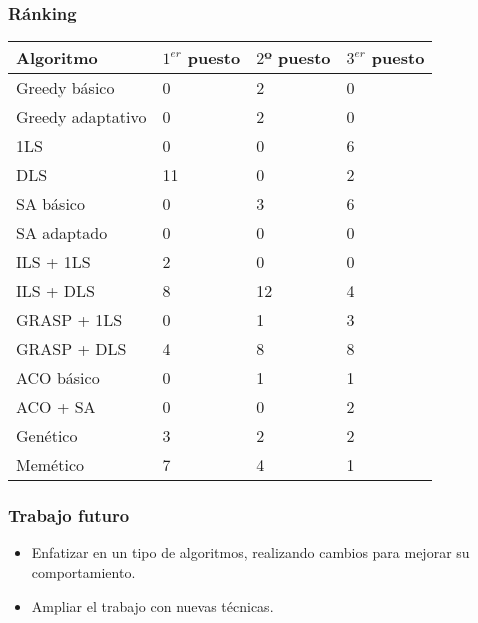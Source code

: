 \documentclass{beamer}
\begin{document}
\begin{frame}
\frametitle{Ránking}

  \tiny
  \begin{table}
  \begin{tabular}{l l l l}
    \textbf{Algoritmo} & \textbf{$1^{er}$ puesto} & \textbf{$2$º puesto} & \textbf{$3^{er}$ puesto} \\ \hline
    Greedy básico          &  0  &  2  &  0  \\ \hline
    Greedy adaptativo      &  0  &  2  &  0  \\ \hline
    1LS                    &  0  &  0  &  6  \\ \hline
    DLS                    &  11  &  0  &  2  \\ \hline
    SA básico              &  0  &  3  &  6  \\ \hline
    SA adaptado            &  0  &  0  &  0  \\ \hline
    ILS + 1LS              &  2  &  0  &  0  \\ \hline
    ILS + DLS              &  8  &  12  &  4  \\ \hline
    GRASP + 1LS            &  0  &  1  &  3  \\ \hline
    GRASP + DLS            &  4  &  8  &  8  \\ \hline
    ACO básico             &  0  &  1  &  1  \\ \hline
    ACO + SA               &  0  &  0  &  2  \\ \hline
    Genético               &  3  &  2  &  2  \\ \hline
    Memético               &  7  &  4  &  1  \\ \hline
    \end{tabular}
  \end{table}
\end{frame}


\begin{frame}
  \frametitle{Trabajo futuro}

  \begin{itemize}
    \item Enfatizar en un tipo de algoritmos, realizando cambios para mejorar su comportamiento.
    \item Ampliar el trabajo con nuevas técnicas.
  \end{itemize}

\end{frame}
\end{document}
